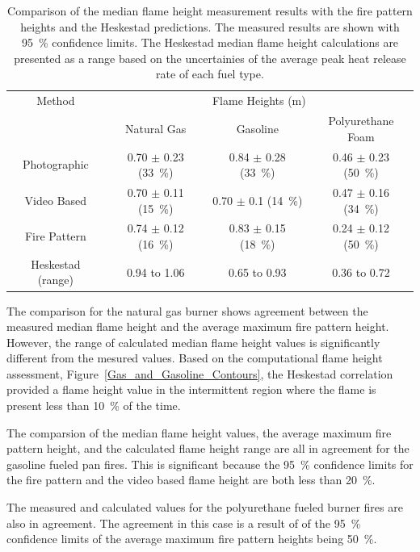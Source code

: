 \documentclass[twoside]{uocthesis}
\begin{document}
{\begin{table}
\centering
\footnotesize
\begin{tabular}{|c|c|c|c|}
\hline
Method          &   \multicolumn{3}{|c|}{Flame Heights (m)} \\ \cline{2-4}
                &       Natural Gas	            &   Gasoline	            & Polyurethane Foam \\ \hline \hline
Photographic    &       0.70 $\pm$ 0.23 (33~\%)   &	0.84 $\pm$ 0.28 (33~\%) 	& 0.46 $\pm$ 0.23 (50~\%)   \\
Video Based     &   	0.70 $\pm$ 0.11 (15~\%)   &	0.70 $\pm$ 0.1 (14~\%) 	& 0.47 $\pm$ 0.16 (34~\%)   \\
Fire Pattern    &   	0.74 $\pm$ 0.12 (16~\%)   &	0.83 $\pm$ 0.15 (18~\%) 	& 0.24 $\pm$ 0.12 (50~\%)   \\
Heskestad (range)  &   	0.94 to 1.06		    &	0.65 to 0.93        	& 0.36 to 0.72   \\
\hline
\end{tabular}
 \caption[Comparison of the median flame height measurement results with the fire pattern heights and the Heskestad predictions]{Comparison of the median flame height measurement results with the fire pattern heights and the Heskestad predictions. The measured results are shown with 95~\% confidence limits.  The Heskestad median flame height calculations are presented as a range based on the uncertainies of the average peak heat release rate of each fuel type.} 
 \label{tab:Comparing_Flame_Heights}
\end{table}

 The comparison for the natural gas burner shows agreement between the measured median flame height and the average maximum fire pattern height. However, the range of calculated median flame height values is significantly different from the mesured values. Based on the computational flame height assessment, Figure~\ref{Gas_and_Gasoline_Contours}, the Heskestad correlation provided a flame height value in the intermittent region where the flame is present less than 10~\% of the time.     

The comparsion of the median flame height values, the average maximum fire pattern height, and the calculated flame height range are all in agreement for the gasoline fueled pan fires. This is significant because the 95~\% confidence limits for the fire pattern and the video based flame height are both less than 20~\%.

The measured and calculated values for the polyurethane fueled burner fires are also in agreement.  The agreement in this case is a result of of the 95~\% confidence limits of the average maximum fire pattern heights being 50~\%. 

}
\end{document}
